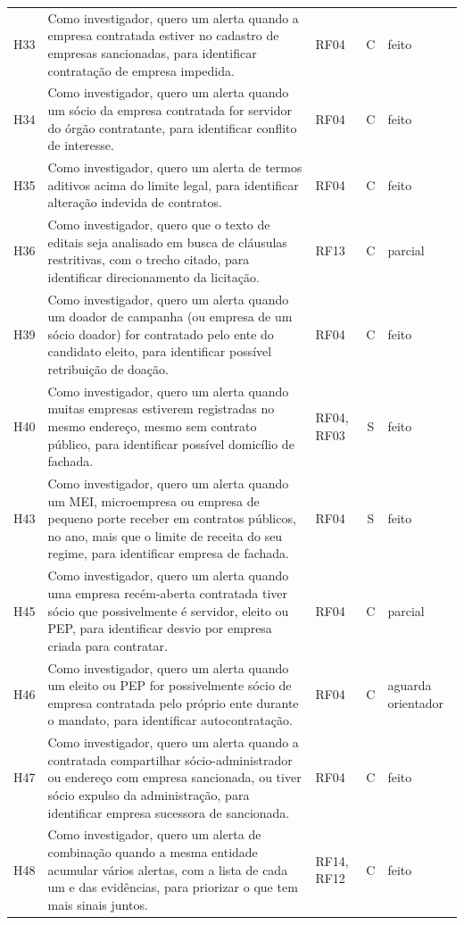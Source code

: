\begin{small}
\begin{longtable}{lp{7.9cm}p{1.3cm}cp{1.9cm}}
H33 & Como investigador, quero um alerta quando a empresa contratada estiver no cadastro de empresas sancionadas, para identificar contratação de empresa impedida. & RF04 & C & feito \\
H34 & Como investigador, quero um alerta quando um sócio da empresa contratada for servidor do órgão contratante, para identificar conflito de interesse. & RF04 & C & feito \\
H35 & Como investigador, quero um alerta de termos aditivos acima do limite legal, para identificar alteração indevida de contratos. & RF04 & C & feito \\
H36 & Como investigador, quero que o texto de editais seja analisado em busca de cláusulas restritivas, com o trecho citado, para identificar direcionamento da licitação. & RF13 & C & parcial \\
H39 & Como investigador, quero um alerta quando um doador de campanha (ou empresa de um sócio doador) for contratado pelo ente do candidato eleito, para identificar possível retribuição de doação. & RF04 & C & feito \\
H40 & Como investigador, quero um alerta quando muitas empresas estiverem registradas no mesmo endereço, mesmo sem contrato público, para identificar possível domicílio de fachada. & RF04, RF03 & S & feito \\
H43 & Como investigador, quero um alerta quando um MEI, microempresa ou empresa de pequeno porte receber em contratos públicos, no ano, mais que o limite de receita do seu regime, para identificar empresa de fachada. & RF04 & S & feito \\
H45 & Como investigador, quero um alerta quando uma empresa recém-aberta contratada tiver sócio que possivelmente é servidor, eleito ou PEP, para identificar desvio por empresa criada para contratar. & RF04 & C & parcial \\
H46 & Como investigador, quero um alerta quando um eleito ou PEP for possivelmente sócio de empresa contratada pelo próprio ente durante o mandato, para identificar autocontratação. & RF04 & C & aguarda orientador \\
H47 & Como investigador, quero um alerta quando a contratada compartilhar sócio-administrador ou endereço com empresa sancionada, ou tiver sócio expulso da administração, para identificar empresa sucessora de sancionada. & RF04 & C & feito \\
H48 & Como investigador, quero um alerta de combinação quando a mesma entidade acumular vários alertas, com a lista de cada um e das evidências, para priorizar o que tem mais sinais juntos. & RF14, RF12 & C & feito \\

\end{longtable}
\end{small}
